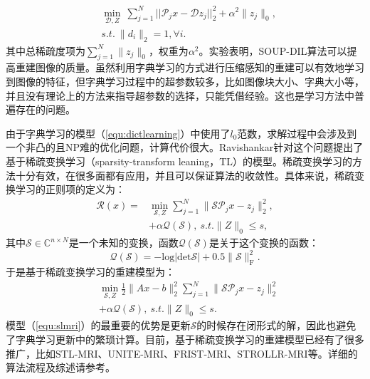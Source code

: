 \begin{equation}
\begin{aligned}
	& \min_{\mathcal{D},Z}\ \sum_{j=1}^N||\mathcal{P}_{j}x-\mathcal{D}z_j||_2^2 + \alpha^2\|z_j\|_0,\\
	&s.t.\ \|d_i\|_2=1, \forall i.
\end{aligned}
\label{equ:soup}
\end{equation}
其中总稀疏度项为$\sum_{j=1}^N\|z_j\|_0$，权重为$\alpha^2$。实验表明，SOUP-DIL算法可以提高重建图像的质量。虽然利用字典学习的方式进行压缩感知的重建可以有效地学习到图像的特征，但字典学习过程中的超参数较多，比如图像块大小、字典大小等，并且没有理论上的方法来指导超参数的选择，只能凭借经验。这也是学习方法中普遍存在的问题。

由于字典学习的模型（\ref{equ:dictlearning}）中使用了$l_0$范数，求解过程中会涉及到一个非凸的且NP难的优化问题\cite{bruckstein2009sparse}，计算代价很大。Ravishankar针对这个问题提出了基于稀疏变换学习（sparsity-transform leaning，TL）的模型\cite{ravishankar2015efficient}。稀疏变换学习的方法十分有效，在很多面都有应用，并且可以保证算法的收敛性。具体来说，稀疏变换学习的正则项的定义为：
\begin{equation}
	\begin{aligned}
		\mathcal{R}(x)=&\min_{\mathcal{S},Z}\sum_{j=1}^N\|\mathcal{S}\mathcal{P}_jx-z_j\|^2_2,\\
		&+\alpha\mathcal{Q}(\mathcal{S}),\ s.t.\|Z\|_0\leq s, 
	\end{aligned}
\end{equation}
其中$\mathcal{S}\in \mathbb{C}^{n\times N}$是一个未知的变换，函数$\mathcal{Q}(\mathcal{S})$是关于这个变换的函数：
\begin{equation}
	\mathcal{Q}(\mathcal{S})=-\mathrm{log}|\mathrm{det}\mathcal{S}|+0.5\|\mathcal{S}\|^2_\mathrm{F}.
\end{equation}
于是基于稀疏变换学习的重建模型为：
\begin{equation}
	\begin{aligned}
		&\min_{\mathcal{S},Z}\frac{1}{2}\|Ax-b\|^2_2\sum_{j=1}^N\|\mathcal{S}\mathcal{P}_jx-z_j\|^2_2\\
		&+\alpha\mathcal{Q}(\mathcal{S}),\ s.t.\|Z\|_0\leq s.
	\end{aligned}
	\label{equ:slmri}
\end{equation}
模型（\ref{equ:slmri}）的最重要的优势是更新$\mathcal{S}$的时候存在闭形式的解，因此也避免了字典学习更新中的繁琐计算。目前，基于稀疏变换学习的重建模型已经有了很多推广，比如STL-MRI\cite{ravishankar2015efficient}、UNITE-MRI\cite{ravishankar2016data}、FRIST-MRI\cite{wen2017frist}、STROLLR-MRI\cite{wen2018power}等。详细的算法流程及综述请参考\cite{wen2019transform}。

